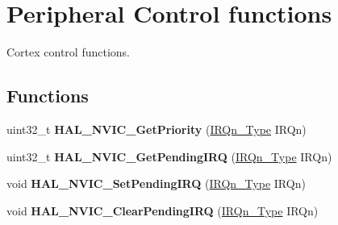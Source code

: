 \hypertarget{group___c_o_r_t_e_x___exported___functions___group2}{}\section{Peripheral Control functions}
\label{group___c_o_r_t_e_x___exported___functions___group2}


Cortex control functions.  


\subsection*{Functions}
\begin{DoxyCompactItemize}
\item 
\mbox{\label{group___c_o_r_t_e_x___exported___functions___group2_ga37e7e4bf3e1eebe549cb5853c5360a70}} 
uint32\+\_\+t {\bfseries H\+A\+L\+\_\+\+N\+V\+I\+C\+\_\+\+Get\+Priority} (\hyperlink{group___peripheral__interrupt__number__definition_ga7e1129cd8a196f4284d41db3e82ad5c8}{I\+R\+Qn\+\_\+\+Type} I\+R\+Qn)
\item 
\mbox{\label{group___c_o_r_t_e_x___exported___functions___group2_ga3bd5802a96f0dcbc00ac3b89b134da3b}} 
uint32\+\_\+t {\bfseries H\+A\+L\+\_\+\+N\+V\+I\+C\+\_\+\+Get\+Pending\+I\+RQ} (\hyperlink{group___peripheral__interrupt__number__definition_ga7e1129cd8a196f4284d41db3e82ad5c8}{I\+R\+Qn\+\_\+\+Type} I\+R\+Qn)
\item 
\mbox{\label{group___c_o_r_t_e_x___exported___functions___group2_gaecf50f6c6d0e1fa5f8bd8c1b45309f18}} 
void {\bfseries H\+A\+L\+\_\+\+N\+V\+I\+C\+\_\+\+Set\+Pending\+I\+RQ} (\hyperlink{group___peripheral__interrupt__number__definition_ga7e1129cd8a196f4284d41db3e82ad5c8}{I\+R\+Qn\+\_\+\+Type} I\+R\+Qn)
\item 
\mbox{\label{group___c_o_r_t_e_x___exported___functions___group2_ga0c7d007acf1339ca1bb46f3c6e018ff5}} 
void {\bfseries H\+A\+L\+\_\+\+N\+V\+I\+C\+\_\+\+Clear\+Pending\+I\+RQ} (\hyperlink{group___peripheral__interrupt__number__definition_ga7e1129cd8a196f4284d41db3e82ad5c8}{I\+R\+Qn\+\_\+\+Type} I\+R\+Qn)
\item 

\end{DoxyCompactItemize}

